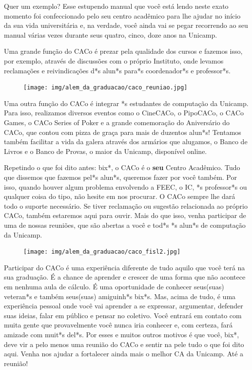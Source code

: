 Quer um exemplo? Esse estupendo manual que você está lendo neste exato momento
foi confeccionado pelo seu centro acadêmico para lhe ajudar no início da sua
vida universitária e, na verdade, você ainda vai se pegar recorrendo ao seu
manual várias vezes durante seus quatro, cinco, doze anos na Unicamp.

Uma grande função do CACo é prezar pela qualidade dos cursos e fazemos isso, por
exemplo, através de discussões com o próprio Instituto, onde levamos reclamações
e reivindicações d*s alun*s para*s coordenador*s e professor*s.

\begin{figure}[H]
    \centering
    \texttt{[image: img/alem\_da\_graduacao/caco\_reuniao.jpg]}
\end{figure}

Uma outra função do CACo é integrar *s estudantes de computação da Unicamp. Para
isso, realizamos diversos eventos como o CineCACo, o PipoCACo, o CACo Games, o
CACo Series of Poker e a grande comemoração do Aniversário do CACo, que contou
com pizza de graça para mais de duzentos alun*s! Tentamos também facilitar a
vida da galera através dos armários que alugamos, o Banco de Livros e o Banco de
Provas, o maior da Unicamp, disponível online.

Repetindo o que foi dito antes: bix*, o CACo é o \textbf{seu} Centro Acadêmico.
Tudo que dissemos que fazemos pel*s alun*s, queremos fazer por você também. Por
isso, quando houver algum problema envolvendo a FEEC, o IC, *s professor*s ou
qualquer coisa do tipo, não hesite em nos procurar. O CACo sempre lhe dará todo
o suporte necessário. Se tiver reclamação ou sugestão relacionada ao próprio
CACo, também estaremos aqui para ouvir. Mais do que isso, venha participar de
uma de nossas reuniões, que são abertas a você e tod*s *s alun*s de computação
da Unicamp.

\begin{figure}[H]
    \centering
    \texttt{[image: img/alem\_da\_graduacao/caco\_fisl2.jpg]}
\end{figure}

Participar do CACo é uma experiência diferente de tudo aquilo que você terá na
sua graduação. É a chance de aprender e crescer de uma forma que não acontece em
nenhuma aula de cálculo. É uma oportunidade de conhecer seus(suas) veteran*s e
também seus(suas) amiguinh*s bix*s. Mas, acima de tudo, é uma experiência
pessoal onde você vai aprender a se expressar, argumentar, defender suas ideias,
falar em público e pensar no coletivo. Você entrará em contato com muita gente
que provavelmente você nunca iria conhecer e, com certeza, fará amizade com
muit*s del*s. Por esses e muitos outros motivos é que você, bix*, deve vir a
pelo menos uma reunião do CACo e sentir na pele tudo o que foi dito aqui. Venha
nos ajudar a fortalecer ainda mais o melhor CA da Unicamp. Até a reunião!

